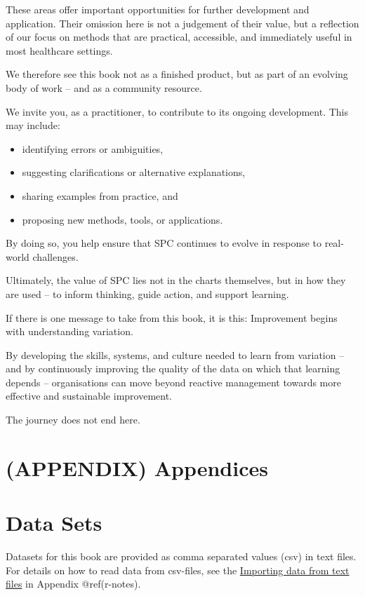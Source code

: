 \documentclass[
]{book}
\providecommand{\tightlist}{%
  \setlength{\itemsep}{0pt}\setlength{\parskip}{0pt}}
\begin{document}
These areas offer important opportunities for further development and
application. Their omission here is not a judgement of their value, but
a reflection of our focus on methods that are practical, accessible, and
immediately useful in most healthcare settings.

We therefore see this book not as a finished product, but as part of an
evolving body of work -- and as a community resource.

We invite you, as a practitioner, to contribute to its ongoing
development. This may include:

\begin{itemize}
\tightlist
\item
  identifying errors or ambiguities,
\item
  suggesting clarifications or alternative explanations,
\item
  sharing examples from practice, and
\item
  proposing new methods, tools, or applications.
\end{itemize}

By doing so, you help ensure that SPC continues to evolve in response to
real-world challenges.

Ultimately, the value of SPC lies not in the charts themselves, but in
how they are used -- to inform thinking, guide action, and support
learning.

If there is one message to take from this book, it is this: Improvement
begins with understanding variation.

By developing the skills, systems, and culture needed to learn from
variation -- and by continuously improving the quality of the data on
which that learning depends -- organisations can move beyond reactive
management towards more effective and sustainable improvement.

The journey does not end here.

\chapter*{(APPENDIX) Appendices}\label{appendix-appendices}

\chapter{Data Sets}\label{data-sets}

Datasets for this book are provided as comma separated values (csv) in
text files. For details on how to read data from csv-files, see the
\hyperref[importing-data-from-text-files]{Importing data from text
files} in Appendix @ref(r-notes).
\end{document}
